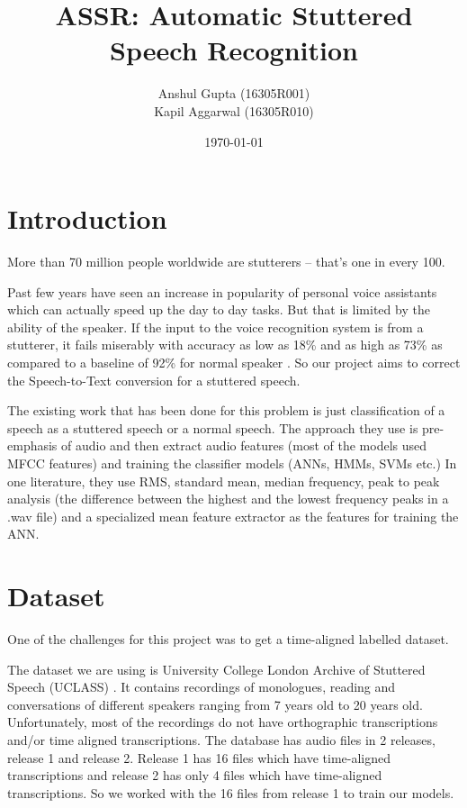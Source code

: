 \documentclass{report}
\title{\textbf{ASSR: Automatic Stuttered Speech Recognition}}
\author{Anshul Gupta (16305R001) \\ Kapil Aggarwal (16305R010)}
\date{\today}
\begin{document}
\maketitle

\tableofcontents

\chapter{Introduction}
More than 70 million people worldwide are stutterers -- that's one in every 100.

Past few years have seen an increase in popularity of personal voice assistants which can actually speed up the day to day tasks. But that is limited by the ability of the speaker.
If the input to the voice recognition system is from a stutterer, it fails miserably with accuracy as low as 18\% and as high as 73\% as compared to a baseline of 92\% for normal speaker \cite{siriStats}. So our project aims to correct the Speech-to-Text conversion for a stuttered speech.

The existing work \cite{manuChopra} that has been done for this problem is just classification of a speech as a stuttered speech or a normal speech. The approach they use is pre-emphasis of audio and then extract audio features (most of the models used MFCC features) and training the classifier models (ANNs, HMMs, SVMs etc.)
In one literature, they use RMS, standard mean, median frequency, peak to peak analysis (the difference between the highest and the lowest frequency peaks in a .wav file) and a specialized mean feature extractor as the features for training the ANN.


\chapter{Dataset}
One of the challenges for this project was to get a time-aligned labelled dataset.

The dataset we are using is University College London Archive of Stuttered Speech (UCLASS) \cite{uclass}. It contains recordings of monologues, reading and conversations of different speakers ranging from 7 years old to 20 years old. Unfortunately, most of the recordings do not have orthographic transcriptions and/or time aligned transcriptions. The database has audio files in 2 releases, release 1 and release 2. Release 1 has 16 files which have time-aligned transcriptions and release 2 has only 4 files which have time-aligned transcriptions. So we worked with the 16 files from release 1 to train our models. 
\end{document}
